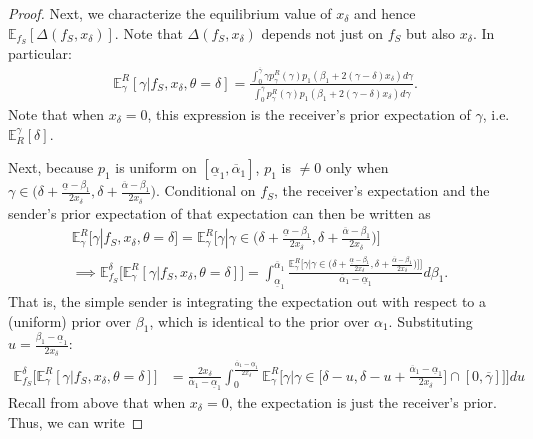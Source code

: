 \documentclass[11pt,dvipsnames]{article}
\begin{document}
\begin{appendix}
\begin{proof}
Next,  we characterize the equilibrium value of $x_\delta$ and hence $\mathbb{E}_{f_S}[\Delta(f_S,x_\delta)]$.
Note that $\Delta(f_S,x_\delta)$ depends not just on $f_S$ but also $x_\delta$.
In particular:
\begin{align*}
&\mathbb{E}_\gamma^R[\gamma|f_S,x_\delta,\theta=\delta]
= \frac{\int_{0}^{\overline{\gamma}}\gamma p_\gamma^R(\gamma)p_1(\beta_1+2(\gamma-\delta)x_\delta) d\gamma}{\int_{0}^{\overline{\gamma}} p_\gamma^R(\gamma)p_1(\beta_1+2(\gamma-\delta)x_\delta) d\gamma}	.
\end{align*}
Note that when $x_\delta = 0$, this expression is the receiver's prior expectation of $\gamma$, i.e. $\mathbb{E}_R^\gamma[\delta]$.

Next, because $p_1$ is uniform on $[\underline{\alpha}_1,\overline{\alpha}_1]$, $p_1$ is $\neq 0$ only when $\gamma \in \big(\delta +\frac{\underline{\alpha}-\beta_1}{2x_\delta} ,\delta + \frac{\overline{\alpha}-\beta_1}{2x_\delta}\big)$.
Conditional on $f_S$, the receiver's expectation and the sender's prior expectation of that expectation can then be written as
\begin{align*}
\mathbb{E}_\gamma^R[\gamma|f_S,x_\delta,\theta=\delta]
= \mathbb{E}_\gamma^R\big[\gamma| \gamma \in \big(\delta +\frac{\underline{\alpha}-\beta_1}{2x_\delta} ,\delta + \frac{\overline{\alpha}-\beta_1}{2x_\delta}\big)\big]
\\
\implies
\mathbb{E}_{f_S}^\delta\big[\mathbb{E}_\gamma^R[\gamma|f_S,x_\delta,\theta=\delta]\big]
= \int_{\underline{\alpha}_1}^{\overline{\alpha}_1}\frac{\mathbb{E}_\gamma^R\big[\gamma| \gamma \in \big(\delta +\frac{\underline{\alpha}-\beta_1}{2x_\delta} ,\delta + \frac{\overline{\alpha}-\beta_1}{2x_\delta}\big)\big]\big]}{\overline{\alpha}_1-\underline{\alpha}_1}d\beta_1.
\end{align*}
That is, the simple sender is integrating the expectation out with respect to a (uniform) prior over $\beta_1$, which is identical to the prior over $\alpha_1$.
Substituting $u = \frac{\beta_1-\underline{\alpha}_1}{2x_\delta}$:
\begin{align*}
\mathbb{E}_{f_S}^\delta\big[\mathbb{E}_\gamma^R[\gamma|f_S,x_\delta,\theta=\delta]\big]
&= \frac{2x_\delta}{{\overline{\alpha}_1-\underline{\alpha}_1}}\int_{0}^{\frac{\overline{\alpha}_1-\underline{\alpha}_1}{2x_\delta}}\mathbb{E}_\gamma^R\big[\gamma| \gamma \in \big[\delta -u,\delta -u+ \frac{\overline{\alpha}_1-\underline{\alpha}_1}{2x_\delta}\big] \cap [0,\overline{\gamma}]\big]\big]du
\end{align*}
Recall from above that when $x_\delta=0$, the expectation is just the receiver's prior. Thus, we can write

\end{proof}
\end{appendix}
\end{document}
